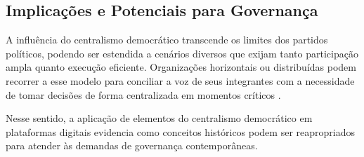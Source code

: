\subsection{Implicações e Potenciais para Governança}
\label{sec:implicacoes_potenciais}

A influência do centralismo democrático transcende os limites dos
partidos políticos, podendo ser estendida a cenários diversos que
exijam tanto participação ampla quanto execução eficiente.
Organizações horizontais ou distribuídas podem recorrer a esse modelo
para conciliar a voz de seus integrantes com a necessidade de tomar
decisões de forma centralizada em momentos críticos
\cite{StillaCenturyoftheChineseModel,ACenturyofDemocraticCentralism}.

Nesse sentido, a aplicação de elementos do centralismo democrático em
plataformas digitais evidencia como conceitos históricos podem ser
reapropriados para atender às demandas de governança contemporâneas.